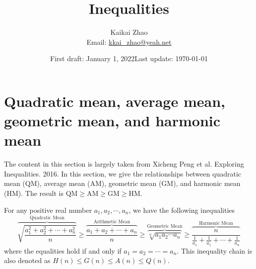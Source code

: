 \documentclass{article}
\theoremstyle{remark}
\begin{document}
\title{Inequalities}
\author{Kaikai Zhao\\
Email: \href{mailto:kkai\_zhao@yeah.net}{kkai\_zhao@yeah.net}
}

\date{First draft: January 1, 2022\quad Last update: \today}
\maketitle
\tableofcontents






\section{Quadratic mean, average mean, geometric mean, and harmonic mean}
The content in this section is largely taken from Xicheng Peng et al. Exploring Inequalities. 2016. In this section, we give the relationships between quadratic mean (QM), average mean (AM), geometric mean (GM), and harmonic mean (HM). The result is QM$\ge$AM$\ge$GM$\ge$HM.

For any positive real number $a_1,a_2,\cdots,a_n$, we have the following inequalities
\begin{equation}\label{AM-GM-HM}
\overbrace{\sqrt{\frac{a_1^2+a_2^2+\cdots+a_n^2}{n}}}^{\text{Quadratic Mean}}\ge\overbrace{\frac{a_1+a_2+\cdots+a_n}{n}}^{\text{Arithmetic Mean}}\ge\overbrace{\sqrt[n]{a_1a_2\cdots a_n}}^{\text{Geometric Mean}}\ge \overbrace{\frac{n}{\frac{1}{a_1}+\frac{1}{a_1}+\cdots+\frac{1}{a_n}}}^{\text{Harmonic Mean}}
\end{equation}
where the equalities hold if and only if $a_1=a_2=\cdots=a_n$. This inequality chain is also denoted as $H(n)\le G(n)\le A(n)\le Q(n)$.
\end{document}
